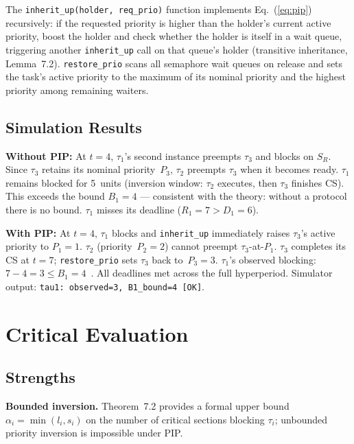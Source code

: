 \documentclass[conference]{IEEEtran}
\begin{document}
The \texttt{inherit\_up(holder, req\_prio)} function implements
Eq.~(\ref{eq:pip}) recursively: if the requested priority is higher
than the holder's current active priority, boost the holder and check
whether the holder is itself in a wait queue, triggering another
\texttt{inherit\_up} call on that queue's holder (transitive
inheritance, Lemma~7.2).
\texttt{restore\_prio} scans all semaphore wait queues on release
and sets the task's active priority to the maximum of its nominal
priority and the highest priority among remaining waiters.

\subsection{Simulation Results}

\textbf{Without PIP:} At $t{=}4$, $\tau_1$'s second instance preempts
$\tau_3$ and blocks on $S_R$.
Since $\tau_3$ retains its nominal priority~$P_3$, $\tau_2$ preempts
$\tau_3$ when it becomes ready.
$\tau_1$ remains blocked for 5~units (inversion window:
$\tau_2$ executes, then $\tau_3$ finishes CS).
This exceeds the bound $B_1{=}4$ --- consistent with the theory:
without a protocol there is no bound.
$\tau_1$ misses its deadline ($R_1{=}7 > D_1{=}6$).

\textbf{With PIP:} At $t{=}4$, $\tau_1$ blocks and \texttt{inherit\_up}
immediately raises $\tau_3$'s active priority to $P_1{=}1$.
$\tau_2$ (priority~$P_2{=}2$) cannot preempt $\tau_3$-at-$P_1$.
$\tau_3$ completes its CS at $t{=}7$; \texttt{restore\_prio} sets
$\tau_3$ back to~$P_3{=}3$.
$\tau_1$'s observed blocking: $7{-}4{=}3 \leq B_1{=}4$~\checkmark.
All deadlines met across the full hyperperiod.
Simulator output: \texttt{tau1: observed=3, B1\_bound=4~[OK]}.

\section{Critical Evaluation}
\label{sec:eval}

\subsection{Strengths}

\textbf{Bounded inversion.} Theorem~7.2 provides a formal upper bound
$\alpha_i = \min(l_i, s_i)$ on the number of critical sections
blocking $\tau_i$; unbounded priority inversion is impossible under PIP.
\end{document}
